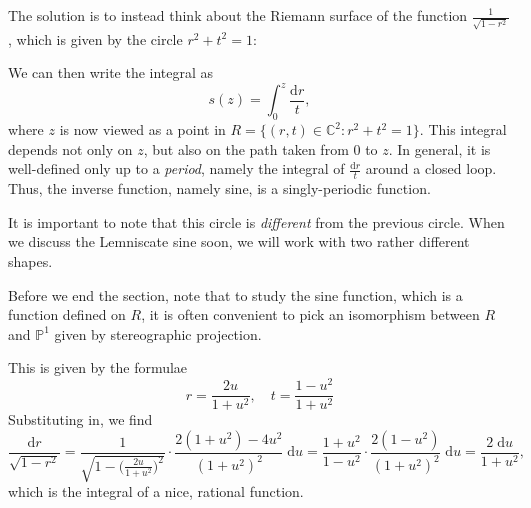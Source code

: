 \documentclass{shortart}
\theoremstyle{definition}
\newcommand\C{\mathbb{C}}
\renewcommand\P{\mathbb{P}}
\renewcommand\d{\mathrm{d}}
\begin{document}
The solution is to instead think about the Riemann surface of the function $\frac{1}{\sqrt{1 - r^2}}$, which is given by the circle $r^2 + t^2 = 1$:
\begin{center}
\end{center}
We can then write the integral as
\[
  s(z) = \int_0^z \frac{\d r}{t},
\]
where $z$ is now viewed as a point in $R = \{(r, t) \in \C^2: r^2 + t^2 = 1\}$. This integral depends not only on $z$, but also on the path taken from $0$ to $z$. In general, it is well-defined only up to a \emph{period}, namely the integral of $\frac{\d r}{t}$ around a closed loop. Thus, the inverse function, namely sine, is a singly-periodic function.

It is important to note that this circle is \emph{different} from the previous circle. When we discuss the Lemniscate sine soon, we will work with two rather different shapes.

Before we end the section, note that to study the sine function, which is a function defined on $R$, it is often convenient to pick an isomorphism between $R$ and $\P^1$ given by stereographic projection.
\begin{center}
\end{center}
This is given by the formulae
\[
  r = \frac{2u}{1 + u^2},\quad t = \frac{1 - u^2}{1 + u^2}
\]
Substituting in, we find
\[
  \frac{\d r}{\sqrt{1 - r^2}} = \frac{1}{\sqrt{1 - \big(\frac{2u}{1 + u^2}\big)^2}} \cdot \frac{2 (1 + u^2) - 4u^2}{(1 + u^2)^2}\;\d u = \frac{1 + u^2}{1 - u^2} \cdot \frac{2 (1 - u^2)}{(1 + u^2)^2}\;\d u = \frac{2\;\d u}{1 + u^2},
\]
which is the integral of a nice, rational function.
\end{document}

